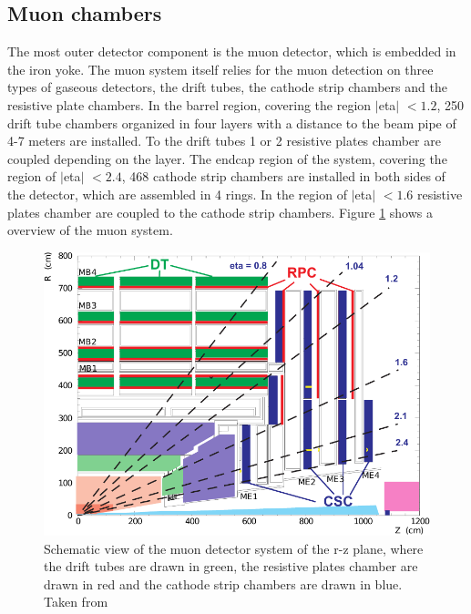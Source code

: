 \subsection*{Muon chambers}

The most outer detector component is the muon detector, which is embedded in the iron yoke. The muon system itself relies for the muon detection on three types of gaseous detectors, the drift tubes, the cathode strip chambers and the resistive plate chambers. In the barrel region, covering the region $|$\gls{eta}$|$ $< 1.2$, 250 drift tube chambers organized in four layers with a distance to the beam pipe of 4-7 meters are installed. To the drift tubes 1 or 2 resistive plates chamber are coupled depending on the layer. The endcap region of the system, covering the region of $|$\gls{eta}$|$ $< 2.4$, 468 cathode strip chambers are installed in both sides of the detector, which are assembled in 4 rings. In the region of $|$\gls{eta}$|$ $< 1.6$  resistive plates chamber are coupled to the cathode strip chambers. Figure \ref{fig:fig_2_10} shows a overview of the muon system.

\begin{figure}[ht]
	\centering
	\includegraphics[width=1\textwidth]{pictures/MUON_SYSTEM.pdf}

	\caption[Muon detector system of CMS]{Schematic view of the muon detector system of the r-z plane, where the drift tubes are drawn in green, the resistive plates chamber are drawn in red and the cathode strip chambers are drawn in blue. Taken from \cite{CMS2}}
	\label{fig:fig_2_10}
\end{figure}


